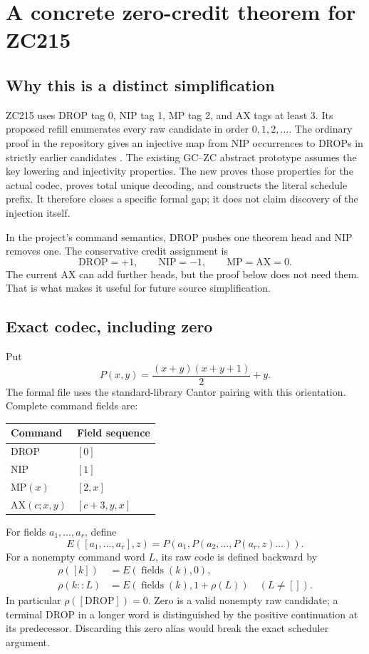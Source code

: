 \section{A concrete zero-credit theorem for ZC215}\label{sec:credit}

\subsection{Why this is a distinct simplification}

ZC215 uses DROP tag 0, NIP tag 1, MP tag 2, and AX tags at least 3. Its
proposed refill enumerates every raw candidate in order $0,1,2,\ldots$.
The ordinary proof in the repository gives an injective map from NIP
occurrences to DROPs in strictly earlier candidates \cite{zerocredit}.
The existing GC--ZC abstract prototype assumes the key lowering and
injectivity properties. The new  proves those
properties for the actual codec, proves total unique decoding, and constructs
the literal schedule prefix. It therefore closes a specific formal gap;
it does not claim discovery of the injection itself.

In the project's command semantics, DROP pushes one theorem head and NIP
removes one. The conservative credit assignment is
\[
 \mathrm{DROP}=+1,\qquad \mathrm{NIP}=-1,
 \qquad\mathrm{MP}=\mathrm{AX}=0.
\]
The current AX can add further heads, but the proof below does not need them.
That is what makes it useful for future source simplification.

\subsection{Exact codec, including zero}

Put
\[
 P(x,y)=\frac{(x+y)(x+y+1)}2+y.
\]
The formal file uses the standard-library Cantor pairing with this
orientation. Complete command fields are:
\begin{center}
\begin{tabular}{@{}ll@{}}\toprule
Command & Field sequence\\\midrule
DROP & $[0]$\\
NIP & $[1]$\\
MP$(x)$ & $[2,x]$\\
AX$(c;x,y)$ & $[c+3,y,x]$\\\bottomrule
\end{tabular}
\end{center}
For fields $a_1,\ldots,a_r$, define
\[
 E([a_1,\ldots,a_r],z)=P(a_1,P(a_2,\ldots,P(a_r,z)\ldots)).
\]
For a nonempty command word $L$, its raw code is defined backward by
\begin{align*}
 \rho([k])&=E(\operatorname{fields}(k),0),\\
 \rho(k::L)&=E(\operatorname{fields}(k),1+\rho(L))
 \quad(L\ne[]).
\end{align*}
In particular $\rho([\mathrm{DROP}])=0$. Zero is a valid nonempty raw
candidate; a terminal DROP in a longer word is distinguished by the
positive continuation at its predecessor. Discarding this zero alias would
break the exact scheduler argument.

